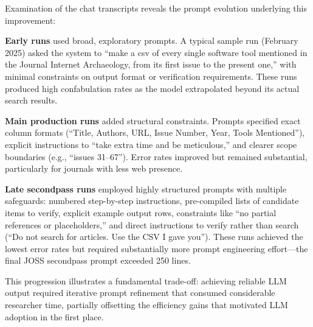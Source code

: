 


Examination of the chat transcripts reveals the prompt evolution underlying this improvement:

\textbf{Early runs} used broad, exploratory prompts. A typical sample run (February 2025) asked the system to ``make a csv of every single software tool mentioned in the Journal Internet Archaeology, from its first issue to the present one,'' with minimal constraints on output format or verification requirements. These runs produced high confabulation rates as the model extrapolated beyond its actual search results.

\textbf{Main production runs} added structural constraints. Prompts specified exact column formats (``Title, Authors, URL, Issue Number, Year, Tools Mentioned''), explicit instructions to ``take extra time and be meticulous,'' and clearer scope boundaries (e.g., ``issues 31--67''). Error rates improved but remained substantial, particularly for journals with less web presence.

\textbf{Late secondpass runs} employed highly structured prompts with multiple safeguards: numbered step-by-step instructions, pre-compiled lists of candidate items to verify, explicit example output rows, constraints like ``no partial references or placeholders,'' and direct instructions to verify rather than search (``Do not search for articles. Use the CSV I gave you''). These runs achieved the lowest error rates but required substantially more prompt engineering effort---the final JOSS secondpass prompt exceeded 250 lines.

This progression illustrates a fundamental trade-off: achieving reliable LLM output required iterative prompt refinement that consumed considerable researcher time, partially offsetting the efficiency gains that motivated LLM adoption in the first place.

